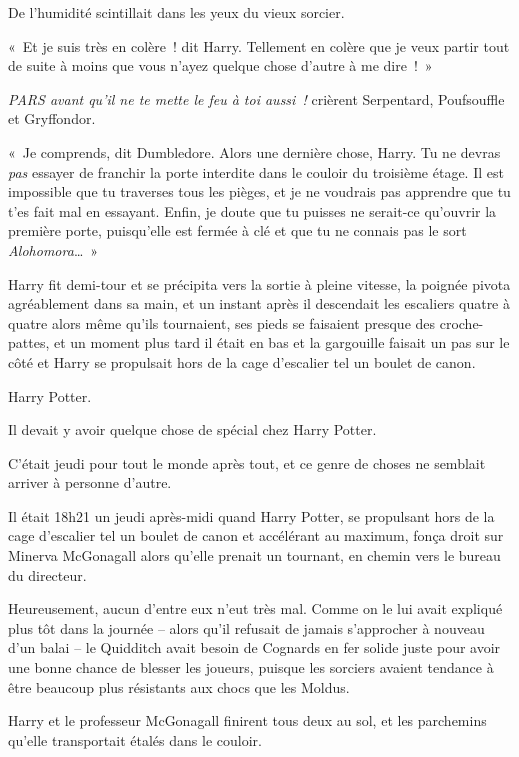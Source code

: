 De l'humidité scintillait dans les yeux du vieux sorcier.

«~Et je suis très en colère~! dit Harry.
Tellement en colère que je veux partir tout de suite à moins que vous n'ayez quelque chose d'autre à me dire~!~»

\emph{PARS avant qu'il ne te mette le feu à toi aussi~!} crièrent Serpentard, Poufsouffle et Gryffondor.

«~Je comprends, dit Dumbledore.
Alors une dernière chose, Harry.
Tu ne devras \emph{pas} essayer de franchir la porte interdite dans le couloir du troisième étage.
Il est impossible que tu traverses tous les pièges, et je ne voudrais pas apprendre que tu t'es fait mal en essayant.
Enfin, je doute que tu puisses ne serait-ce qu'ouvrir la première porte, puisqu'elle est fermée à clé et que tu ne connais pas le sort \emph{Alohomora}…~»

Harry fit demi-tour et se précipita vers la sortie à pleine vitesse, la poignée pivota agréablement dans sa main, et un instant après il descendait les escaliers quatre à quatre alors même qu'ils tournaient, ses pieds se faisaient presque des croche-pattes, et un moment plus tard il était en bas et la gargouille faisait un pas sur le côté et Harry se propulsait hors de la cage d'escalier tel un boulet de canon.

\later

Harry Potter.

Il devait y avoir quelque chose de spécial chez Harry Potter.

C'était jeudi pour tout le monde après tout, et ce genre de choses ne semblait arriver à personne d'autre.

Il était 18h21 un jeudi après-midi quand Harry Potter, se propulsant hors de la cage d'escalier tel un boulet de canon et accélérant au maximum, fonça droit sur Minerva McGonagall alors qu'elle prenait un tournant, en chemin vers le bureau du directeur.

Heureusement, aucun d'entre eux n'eut très mal.
Comme on le lui avait expliqué plus tôt dans la journée -- alors qu'il refusait de jamais s'approcher à nouveau d'un balai -- le Quidditch avait besoin de Cognards en fer solide juste pour avoir une bonne chance de blesser les joueurs, puisque les sorciers avaient tendance à être beaucoup plus résistants aux chocs que les Moldus.

Harry et le professeur McGonagall finirent tous deux au sol, et les parchemins qu'elle transportait étalés dans le couloir.

